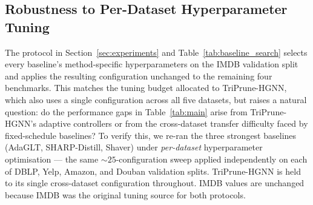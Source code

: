 \documentclass[10pt]{article}
\theoremstyle{plain}
\theoremstyle{definition}
\begin{document}
\subsection{Robustness to Per-Dataset Hyperparameter Tuning}
\label{sec:retuning}

The protocol in Section~\ref{sec:experiments} and Table~\ref{tab:baseline_search} selects every baseline's method-specific hyperparameters on the IMDB validation split and applies the resulting configuration unchanged to the remaining four benchmarks. This matches the tuning budget allocated to TriPrune-HGNN, which also uses a single configuration across all five datasets, but raises a natural question: do the performance gaps in Table~\ref{tab:main} arise from TriPrune-HGNN's adaptive controllers or from the cross-dataset transfer difficulty faced by fixed-schedule baselines? To verify this, we re-ran the three strongest baselines (AdaGLT, SHARP-Distill, Shaver) under \emph{per-dataset} hyperparameter optimisation --- the same $\sim\!25$-configuration sweep applied independently on each of DBLP, Yelp, Amazon, and Douban validation splits. TriPrune-HGNN is held to its single cross-dataset configuration throughout. IMDB values are unchanged because IMDB was the original tuning source for both protocols.

\begin{table}[ht!]
\centering
\caption{\textbf{MAE under per-dataset baseline tuning.} TriPrune-HGNN uses one configuration across all five datasets; the three strongest baselines are re-tuned independently on each non-IMDB validation split ($\sim\!25$ configurations per dataset, matching the original tuning budget). The Avg~$\Delta$ column reports the MAE improvement of per-dataset tuning over the single-source-tuned values reported in Table~\ref{tab:main} (MAE row, averaged across DBLP / Yelp / Amazon / Douban). Lower is better.}
\label{tab:retuning}
\setlength{\tabcolsep}{5pt}
\renewcommand{\arraystretch}{1.15}
\tiny
{}
\end{table}
\end{document}

